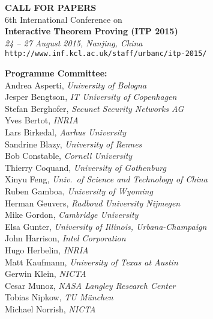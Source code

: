 \documentclass{article}
\begin{document}
\begin{center}
\textbf{CALL FOR PAPERS}\\[1.2ex]
{\normalsize 6th International Conference on }\\[0.8ex]
{\large\bfseries Interactive Theorem Proving (ITP 2015)}\\[0.8ex]
{\normalsize\itshape 24 -- 27 August 2015, Nanjing, China}\\[1.2ex]
\texttt{http://www.inf.kcl.ac.uk/staff/urbanc/itp-2015/}
\end{center}

\vspace{0mm}

\begin{minipage}[t]{6.9cm}%
\renewcommand{\baselinestretch}{0.99}\parskip 4pt\small

\textbf{Programme Committee:} \\
Andrea Asperti, \emph{University of Bologna}\\
Jesper Bengtson, \emph{IT University of Copenhagen}\\
Stefan Berghofer, \emph{Secunet Security Networks AG}\\
Yves Bertot, \emph{INRIA}\\
Lars Birkedal, \emph{Aarhus University}\\
Sandrine Blazy, \emph{University of Rennes}\\
Bob Constable, \emph{Cornell University}\\
Thierry Coquand, \emph{University of Gothenburg}\\
Xinyu Feng, \emph{Univ.~of Science and Technology of China}\\
Ruben Gamboa, \emph{University of Wyoming}\\
Herman Geuvers, \emph{Radboud University Nijmegen}\\
Mike Gordon, \emph{Cambridge University}\\
Elsa Gunter, \emph{University of Illinois, Urbana-Champaign}\\
John Harrison, \emph{Intel Corporation}\\
Hugo Herbelin, \emph{INRIA}\\
Matt Kaufmann, \emph{University of Texas at Austin}\\
Gerwin Klein, \emph{NICTA}\\
Cesar Munoz, \emph{NASA Langley Research Center}\\
Tobias Nipkow, \emph{TU M\"unchen}\\
Michael Norrish, \emph{NICTA}\\

\end{minipage}
\end{document}
